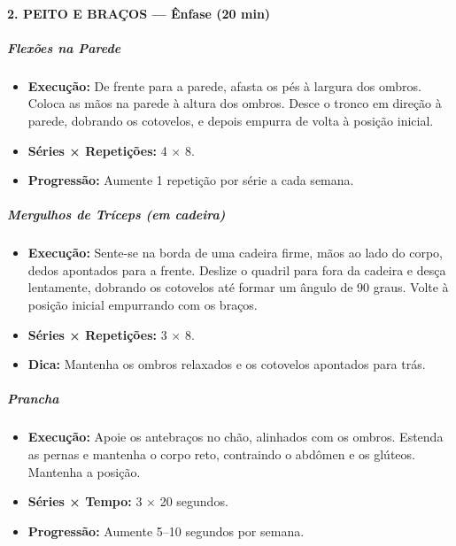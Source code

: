 \documentclass[12pt,a4paper]{scrartcl}
\begin{document}
\paragraph{2. PEITO E BRAÇOS — Ênfase (20 min)}
\subparagraph{Flexões na Parede}
\begin{itemize}
    \item \textbf{Execução:} De frente para a parede, afasta os pés à largura dos ombros. Coloca as mãos na parede à altura dos ombros. Desce o tronco em direção à parede, dobrando os cotovelos, e depois empurra de volta à posição inicial.
    \item \textbf{Séries × Repetições:} 4 × 8.
    \item \textbf{Progressão:} Aumente 1 repetição por série a cada semana.
\end{itemize}
\begin{center}
\end{center}

\subparagraph{Mergulhos de Tríceps (em cadeira)}
\begin{itemize}
    \item \textbf{Execução:} Sente-se na borda de uma cadeira firme, mãos ao lado do corpo, dedos apontados para a frente. Deslize o quadril para fora da cadeira e desça lentamente, dobrando os cotovelos até formar um ângulo de 90 graus. Volte à posição inicial empurrando com os braços.
    \item \textbf{Séries × Repetições:} 3 × 8.
    \item \textbf{Dica:} Mantenha os ombros relaxados e os cotovelos apontados para trás.
\end{itemize}
\begin{center}
\end{center}

\subparagraph{Prancha}
\begin{itemize}
    \item \textbf{Execução:} Apoie os antebraços no chão, alinhados com os ombros. Estenda as pernas e mantenha o corpo reto, contraindo o abdômen e os glúteos. Mantenha a posição.
    \item \textbf{Séries × Tempo:} 3 × 20 segundos.
    \item \textbf{Progressão:} Aumente 5–10 segundos por semana.
\end{itemize}
\begin{center}
\end{center}
\end{document}

